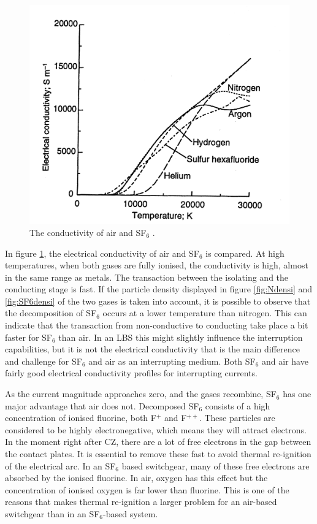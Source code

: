 \documentclass[10pt,a4paper,twoside]{article}
\begin{document}
\begin{figure}[H]
\centering
\includegraphics[scale=1.1]{Bilder/Discussion/conductSF6AndAIR.png}
\caption{The conductivity of air and SF${_6}$ \cite{bib:THFD}.} \label{fig:AirandSF6ConComp}
\end{figure}

In figure \ref{fig:AirandSF6ConComp}, the electrical conductivity of air and SF$_6$ is compared. At high temperatures, when both gases are fully ionised, the conductivity is high, almost in the same range as metals. The transaction between the isolating and the conducting stage is fast. If the particle density displayed in figure \ref{fig:Ndensi} and \ref{fig:SF6densi} of the two gases is taken into account, it is possible to observe that the decomposition of SF$_6$ occurs at a lower temperature than nitrogen. This can indicate that the transaction from non-conductive to conducting take place a bit faster for SF$_6$ than air. In an LBS this might slightly influence the interruption capabilities, but it is not the electrical conductivity that is the main difference and challenge for SF$_6$ and air as an interrupting medium. Both SF$_6$ and air have fairly good electrical conductivity profiles for interrupting currents.

As the current magnitude approaches zero, and the gases recombine, SF$_6$ has one major advantage that air does not. Decomposed SF$_6$ consists of a high concentration of ionised fluorine, both F$^{+}$ and F$^{++}$. These particles are considered to be highly electronegative, which means they will attract electrons. In the moment right after CZ, there are a lot of free electrons in the gap between the contact plates. It is essential to remove these fast to avoid thermal re-ignition of the electrical arc. In an SF$_6$ based switchgear, many of these free electrons are absorbed by the ionised fluorine. In air, oxygen has this effect but the concentration of ionised oxygen is far lower than fluorine. This is one of the reasons that makes thermal re-ignition a larger problem for an air-based switchgear than in an SF$_6$-based system.
\end{document}
